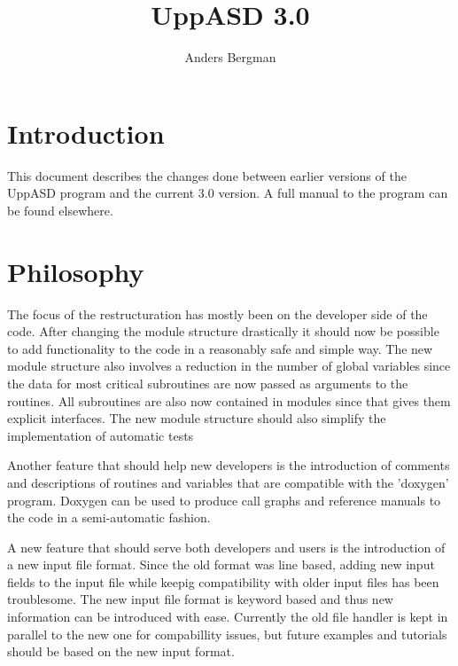 \documentclass{article}
\begin{document}
\title{UppASD 3.0}
\author{Anders Bergman}
\maketitle

\section{Introduction}
This document describes the changes done between earlier versions of the UppASD program and the current 3.0 version.
A full manual to the program can be found elsewhere.

\section{Philosophy}
The focus of the restructuration has mostly been on the developer side of the code. After changing the module structure drastically it should now be possible to add functionality to the code in a reasonably safe and simple way. The new module structure also involves a reduction in the number of global variables since the data for most critical subroutines are now passed as arguments to the routines. All subroutines are also now contained in modules since that gives them explicit interfaces.
The new module structure should also simplify the implementation of automatic tests
\par
Another feature that should help new developers is the introduction of comments and descriptions of routines and variables that are compatible with the 'doxygen' program. Doxygen can be used to produce call graphs and reference manuals to the code in a semi-automatic fashion.
\par
A new feature that should serve both developers and users is the introduction of a new input file format. Since the old format was line based, adding new input fields to the input file while keepig compatibility with older input files has been troublesome. The new input file format is keyword based and thus new information can be introduced with ease. Currently the old file handler is kept in parallel to the new one for compabillity issues, but future examples and tutorials should be based on the new input format. 
\par
\end{document}
